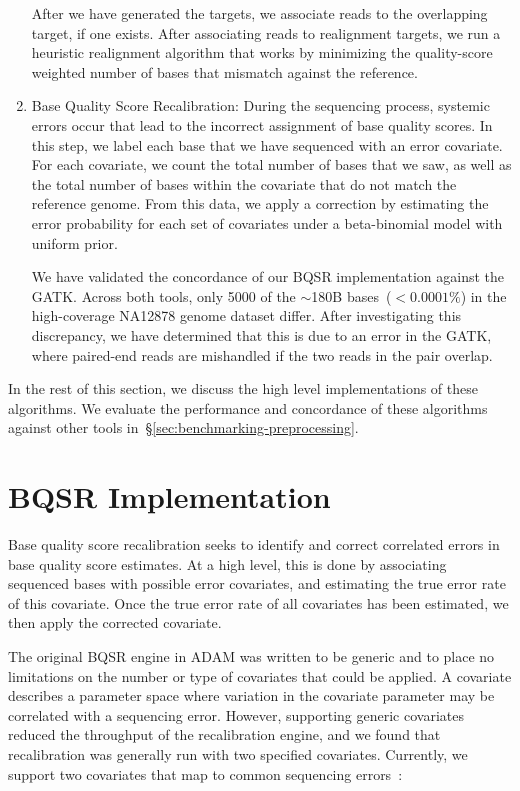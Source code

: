 \documentclass[phd]{ucbthesis}
\begin{document}
\begin{enumerate}
After we have generated the targets, we associate reads to the overlapping target, if one exists. After
associating reads to realignment targets, we run a heuristic realignment algorithm that works by minimizing
the quality-score weighted number of bases that mismatch against the reference.
\item Base Quality Score Recalibration: During the sequencing process, systemic errors occur
that lead to the incorrect assignment of base quality scores. In this step, we label each base that we have
sequenced with an error covariate. For each covariate, we count the total number of bases that we saw,
as well as the total number of bases within the covariate that do not match the reference genome. From this data, 
we apply a correction by estimating the error probability for each set of covariates under a beta-binomial model
with uniform prior.

We have validated the concordance of our BQSR implementation against the GATK. Across both tools, only 5000
of the $\sim$180B bases~($<0.0001\%$) in the high-coverage NA12878 genome dataset differ. After investigating
this discrepancy, we have determined that this is due to an error in the GATK, where paired-end reads are
mishandled if the two reads in the pair overlap.
\end{enumerate}

In the rest of this section, we discuss the high level implementations of these algorithms.
We evaluate the performance and concordance of these algorithms against other
tools in~\S\ref{sec:benchmarking-preprocessing}.

\section{BQSR Implementation}
\label{sec:bqsr-implementation}

Base quality score recalibration seeks to identify and correct correlated errors in base quality score estimates.
At a high level, this is done by associating sequenced bases with possible error covariates, and estimating the
true error rate of this covariate. Once the true error rate of all covariates has been estimated, we then apply
the corrected covariate.

The original BQSR engine in \textsc{ADAM} was written to be generic and to place
no limitations on the number or type of covariates that could be applied. A
covariate describes a parameter space where variation in the covariate parameter
may be correlated with a sequencing error. However, supporting generic covariates
reduced the throughput of the recalibration engine, and we found that
recalibration was generally run with two specified covariates. Currently, we
support two covariates that map to common sequencing errors~\cite{nakamura11}:
\end{document}
